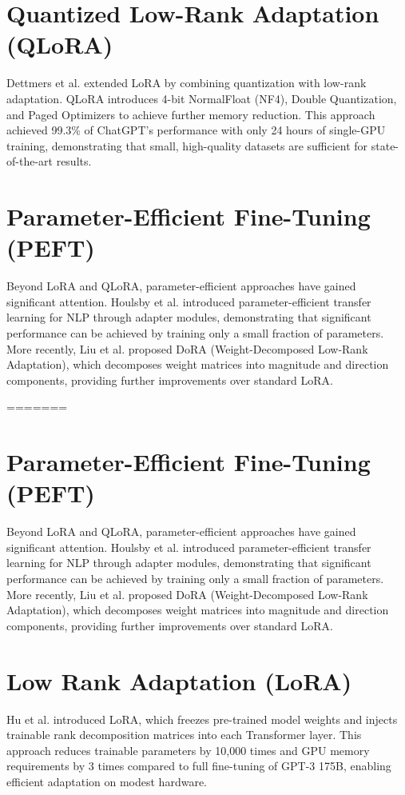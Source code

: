 \section{Quantized Low-Rank Adaptation (QLoRA)}
Dettmers et al. \cite{Dettmers2023} extended LoRA by combining quantization with low-rank adaptation. QLoRA introduces 4-bit NormalFloat (NF4), Double Quantization, and Paged Optimizers to achieve further memory reduction. This approach achieved 99.3\% of ChatGPT's performance with only 24 hours of single-GPU training, demonstrating that small, high-quality datasets are sufficient for state-of-the-art results.

\section{Parameter-Efficient Fine-Tuning (PEFT)}
Beyond LoRA and QLoRA, parameter-efficient approaches have gained significant attention. Houlsby et al. \cite{Houlsby2019} introduced parameter-efficient transfer learning for NLP through adapter modules, demonstrating that significant performance can be achieved by training only a small fraction of parameters. More recently, Liu et al. \cite{Liu2024DoRA} proposed DoRA (Weight-Decomposed Low-Rank Adaptation), which decomposes weight matrices into magnitude and direction components, providing further improvements over standard LoRA.

=======
\section{Parameter-Efficient Fine-Tuning (PEFT)}
Beyond LoRA and QLoRA, parameter-efficient approaches have gained significant attention. Houlsby et al. \cite{Houlsby2019} introduced parameter-efficient transfer learning for NLP through adapter modules, demonstrating that significant performance can be achieved by training only a small fraction of parameters. More recently, Liu et al. \cite{Liu2024DoRA} proposed DoRA (Weight-Decomposed Low-Rank Adaptation), which decomposes weight matrices into magnitude and direction components, providing further improvements over standard LoRA.

\section{Low Rank Adaptation (LoRA)}
Hu et al. \cite{Hu2021} introduced LoRA, which freezes pre-trained model weights and injects trainable rank decomposition matrices into each Transformer layer. This approach reduces trainable parameters by 10,000 times and GPU memory requirements by 3 times compared to full fine-tuning of GPT-3 175B, enabling efficient adaptation on modest hardware.




